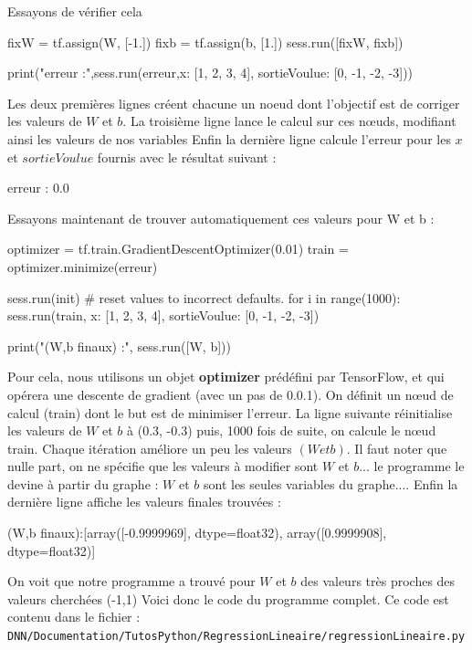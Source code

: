 Essayons de vérifier cela 
\begin{mypython}
fixW = tf.assign(W, [-1.])
fixb = tf.assign(b, [1.])
sess.run([fixW, fixb])

print("erreur :",sess.run(erreur,{x: [1, 2, 3, 4], sortieVoulue: [0, -1, -2, -3]}))
\end{mypython}
Les deux premières lignes créent chacune un noeud dont l'objectif est de corriger les valeurs de $W$ et $b$. La troisième ligne lance le calcul sur ces nœuds, modifiant ainsi les valeurs de nos variables
Enfin la dernière ligne calcule l'erreur pour les $x$ et $sortieVoulue$ fournis avec le résultat suivant :
\begin{myoutput}
erreur : 0.0
\end{myoutput}
Essayons maintenant de trouver automatiquement ces valeurs pour W et b :
\begin{mypython}
optimizer = tf.train.GradientDescentOptimizer(0.01)
train = optimizer.minimize(erreur)

sess.run(init) # reset values to incorrect defaults.
for i in range(1000):
  sess.run(train, {x: [1, 2, 3, 4], sortieVoulue: [0, -1, -2, -3]})

print("(W,b finaux) :", sess.run([W, b]))
\end{mypython}
Pour cela, nous utilisons un objet \textbf{optimizer} prédéfini par TensorFlow, et qui opérera une descente de gradient (avec un pas de 0.0.1). On définit un nœud de calcul (train) dont le but est de minimiser  l'erreur.
La ligne suivante réinitialise les valeurs de $W$ et $b$ à (0.3, -0.3)
puis, 1000 fois de suite, on calcule le nœud train. Chaque itération améliore un peu les valeurs $(W et b)$. Il faut noter que nulle part, on ne spécifie que les valeurs à modifier sont $W$ et $b$... le programme le devine à partir du graphe : $W$ et $b$ sont les seules variables du graphe....
Enfin la dernière ligne affiche les valeurs finales trouvées :
\begin{myoutput}
(W,b finaux):[array([-0.9999969], dtype=float32), array([0.9999908], dtype=float32)]
\end{myoutput}

On voit que notre programme a trouvé pour $W$ et $b$ des valeurs très proches des valeurs cherchées (-1,1)
Voici donc le code du programme complet. Ce code est contenu dans le fichier :\\
\verb+DNN/Documentation/TutosPython/RegressionLineaire/regressionLineaire.py+



